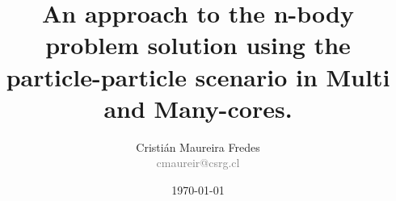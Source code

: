 \documentclass{beamer}
\author[C. Maureira]{\large Cristián Maureira Fredes\\\normalsize \textcolor{gray}{cmaureir@csrg.cl}}
\title[n-body problem using multi and many-cores]{An approach to the n-body problem solution using the particle-particle scenario in Multi and Many-cores.}
\institute[UTFSM]{Departamento de Informática\\Universidad Técnica Federico Santa María}
\date{\today}
\begin{document}
\begin{frame}[t,plain]
\titlepage
\end{frame}



\begin{frame}[t,plain]
\titlepage
\end{frame}
\end{document}
